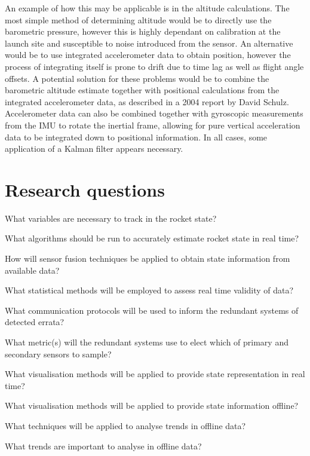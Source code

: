 An example of how this may be applicable is in the altitude calculations. The most simple method of determining altitude would be to directly use the barometric pressure, however this is highly dependant on calibration at the launch site and susceptible to noise introduced from the sensor. An alternative would be to use integrated accelerometer data to obtain position, however the process of integrating itself is prone to drift due to time lag as well as flight angle offsets. A potential solution for these problems would be to combine the barometric altitude estimate together with positional calculations from the integrated accelerometer data, as described in a 2004 report by David Schulz\cite{kalman-apogee}. Accelerometer data can also be combined together with gyroscopic measurements from the IMU to rotate the inertial frame, allowing for pure vertical acceleration data to be integrated down to positional information. In all cases, some application of a Kalman filter appears necessary.


\section{Research questions}
\begin{questions}
  \item What variables are necessary to track in the rocket state?
  \item What algorithms should be run to accurately estimate rocket state in real time?
  \item How will sensor fusion techniques be applied to obtain state information from available data?
  \item What statistical methods will be employed to assess real time validity of data? \begin{questions}
    \item What communication protocols will be used to inform the redundant systems of detected errata?
    \item What metric(s) will the redundant systems use to elect which of primary and secondary sensors to sample?
  \end{questions}
  \item What visualisation methods will be applied to provide state representation in real time?
  \item What visualisation methods will be applied to provide state information offline? \begin{questions}
    \item What techniques will be applied to analyse trends in offline data? 
    \item What trends are important to analyse in offline data?
  \end{questions}
\end{questions}

